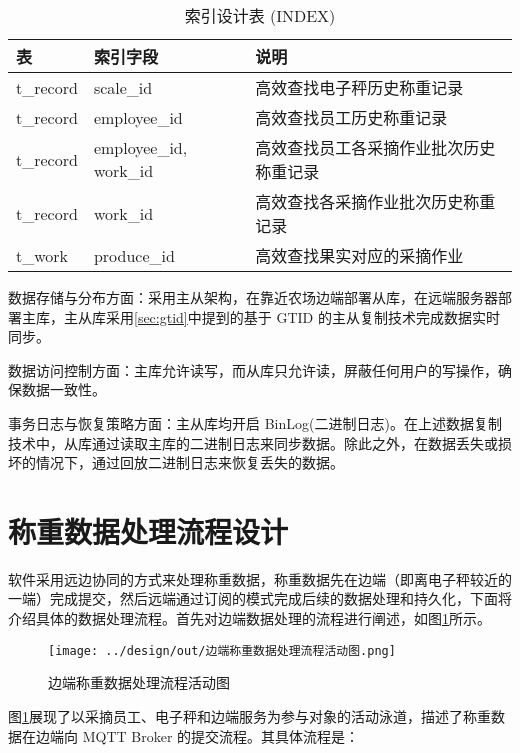\begin{table}[H]
\centering
\caption{索引设计表 (INDEX)}
\label{tab:index}
\begin{tabular}{|l|l|l|}
\hline
表 & 索引字段 & 说明 \\ \hline

t\_record & scale\_id & 高效查找电子秤历史称重记录 \\ \hline

t\_record & employee\_id & 高效查找员工历史称重记录 \\ \hline

t\_record & employee\_id, work\_id & 高效查找员工各采摘作业批次历史称重记录 \\ \hline

t\_record & work\_id & 高效查找各采摘作业批次历史称重记录 \\ \hline

t\_work & produce\_id & 高效查找果实对应的采摘作业 \\ \hline
\end{tabular}
\end{table}

数据存储与分布方面：采用主从架构，在靠近农场边端部署从库，在远端服务器部署主库，主从库采用\ref{sec:gtid}中提到的基于 GTID 的主从复制技术完成数据实时同步。

数据访问控制方面：主库允许读写，而从库只允许读，屏蔽任何用户的写操作，确保数据一致性。

事务日志与恢复策略方面：主从库均开启 BinLog(二进制日志)。在上述数据复制技术中，从库通过读取主库的二进制日志来同步数据。除此之外，在数据丢失或损坏的情况下，通过回放二进制日志来恢复丢失的数据。

\section{称重数据处理流程设计}

软件采用远边协同的方式来处理称重数据，称重数据先在边端（即离电子秤较近的一端）完成提交，然后远端通过订阅的模式完成后续的数据处理和持久化，下面将介绍具体的数据处理流程。首先对边端数据处理的流程进行阐述，如图\ref{fig:边端称重数据处理流程活动图}所示。

\begin{figure}[H]
    \centering
    \texttt{[image: ../design/out/边端称重数据处理流程活动图.png]}
    \caption{边端称重数据处理流程活动图}
    \label{fig:边端称重数据处理流程活动图}
\end{figure}

图\ref{fig:边端称重数据处理流程活动图}展现了以采摘员工、电子秤和边端服务为参与对象的活动泳道，描述了称重数据在边端向 MQTT Broker 的提交流程。其具体流程是：


